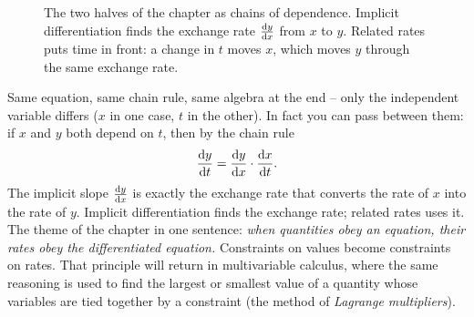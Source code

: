 \begin{figure}[htbp]
\centering
{}
\caption{The two halves of the chapter as chains of dependence. Implicit differentiation finds the
exchange rate $\frac{\mathrm{d} y}{\mathrm{d} x}$ from $x$ to $y$. Related rates puts time in front: a change in $t$ moves
$x$, which moves $y$ through the same exchange rate.}
\label{ch13:fig-two-chains}
\end{figure}

\begin{aestheticbox}
Same equation, same chain rule, same algebra at the end -- only the independent variable differs ($x$
in one case, $t$ in the other). In fact you can pass between them: if $x$ and $y$ both depend on $t$,
then by the chain rule
\[
\frac{\mathrm{d} y}{\mathrm{d} t} = \frac{\mathrm{d} y}{\mathrm{d} x}\cdot\frac{\mathrm{d} x}{\mathrm{d} t}.
\]
The implicit slope $\frac{\mathrm{d} y}{\mathrm{d} x}$ is exactly the exchange rate that converts the rate of $x$ into the
rate of $y$. Implicit differentiation finds the exchange rate; related rates uses it. The theme
of the chapter in one sentence: \emph{when quantities obey an equation, their rates obey
the differentiated equation.} Constraints on values become constraints on rates. That principle will
return in multivariable calculus, where the same reasoning is used to find the largest or smallest
value of a quantity whose variables are tied together by a constraint (the method of
\emph{Lagrange multipliers}).
\end{aestheticbox}

